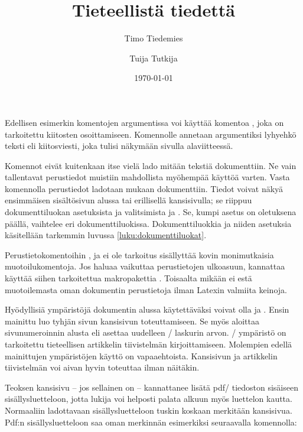 \begin{koodilohkosis}
\title{Tieteellistä tiedettä}              %
\author{Timo Tiedemies \and Tuija Tutkija} %
\date{\today}                              %
\end{koodilohkosis}

Edellisen esimerkin komentojen argumentissa voi käyttää komentoa
, joka on tarkoitettu kiitosten osoittamiseen.
Komennolle annetaan argumentiksi lyhyehkö teksti eli kiitosviesti, joka
tulisi näkymään sivulla alaviitteessä.

Komennot eivät kuitenkaan itse vielä lado mitään tekstiä dokumenttiin.
Ne vain tallentavat perustiedot muistiin mahdollista myöhempää käyttöä
varten. Vasta komennolla  perustiedot ladotaan
mukaan dokumenttiin. Tiedot voivat näkyä ensimmäisen sisältösivun alussa
tai erillisellä kansisivulla; se riippuu dokumenttiluokan asetuksista ja
valitsimista  ja . Se, kumpi asetus
on oletuksena päällä, vaihtelee eri dokumenttiluokissa.
Dokumenttiluokkia ja niiden asetuksia käsitellään tarkemmin luvussa
\ref{luku:dokumenttiluokat}.

Perustietokomentoihin ,  ja
 ei ole tarkoitus sisällyttää kovin monimutkaisia
muotoilukomentoja. Jos haluaa vaikuttaa perustietojen ulkoasuun,
kannattaa käyttää siihen tarkoitettua makropakettia
. Toisaalta mikään ei estä
muotoilemasta oman dokumentin perustietoja ilman Latexin valmiita
keinoja.

Hyödyllisiä ympäristöjä dokumentin alussa käytettäväksi voivat olla
 ja . Ensin mainittu luo
tyhjän sivun kansisivun toteuttamiseen. Se myös aloittaa sivunumeroinnin
alusta eli asettaa uudelleen \-/ laskurin arvon.
\-/ ympäristö on tarkoitettu tieteellisen artikkelin
tiivistelmän kirjoittamiseen. Molempien edellä mainittujen ympäristöjen
käyttö on vapaaehtoista. Kansisivun ja artikkelin tiivistelmän voi aivan
hyvin toteuttaa ilman näitäkin.

Teoksen kansisivu -- jos sellainen on -- kannattanee lisätä pdf\-/
tiedoston sisäiseen sisällysluetteloon, jotta lukija voi helposti palata
alkuun myös luettelon kautta. Normaaliin ladottavaan sisällysluetteloon
tuskin koskaan merkitään kansisivua. Pdf:n sisällysluetteloon saa oman
merkinnän esimerkiksi seuraavalla komennolla:

